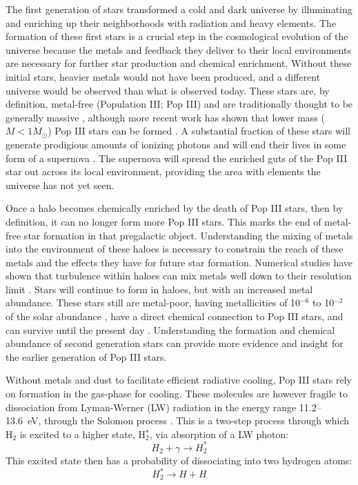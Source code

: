 \documentclass[fleqn,usenatbib]{mnras}
\begin{document}
The first generation of stars transformed a cold and dark universe 
by illuminating and enriching up their neighborhoods with radiation
and heavy elements. The formation of these first stars is a crucial step in the cosmological evolution of the universe because the metals and feedback they deliver to their local environments are necessary for further star production and chemical enrichment. Without these initial stars, heavier metals would not have been produced, and a different universe would be observed than what is observed today. These stars are, by definition, metal-free (Population III; Pop III) and are traditionally thought to be generally massive \citep{ABN02, Bromm02_P3, Turk09, Hosokawa11, Hosokawa16, Hirano15}, although more recent work has shown that lower mass ($M < 1 M_{\odot}$) Pop III stars can be formed \citep{Greif11_P3Cluster, Clark11_Frag, Stacy11}. A substantial fraction of these stars will generate prodigious amounts of ionizing photons and will end their lives in some form of a supernova \citep[e.g.][]{Schaerer02, Heger02}. The supernova will spread the enriched guts of the Pop III star out across its local environment, providing the area with elements the universe has not yet seen. 

Once a halo becomes chemically enriched by the death of Pop III stars, then by definition, it can no longer form more Pop III stars. This marks the end of metal-free star formation in that pregalactic object. Understanding the mixing of metals into the environment of these haloes is necessary to constrain the reach of these metals and the effects they have for future star formation. Numerical studies have shown that turbulence within haloes can mix metals well down to their resolution limit \citep{Wise08_Gal, Greif10, Smith15}. Stars will continue to form in haloes, but with an increased metal abundance. These stars still are metal-poor, having metallicities of 10$^{-6}$ to 10$^{-2}$ of the solar abundance \citep{Chiaki16, Chiaki18, Ritter16}, have a direct chemical connection to Pop III stars, and can survive until the present day \citep{Gnedin06, Tumlinson10, Griffen18, Magg18, Ezzeddine19}. Understanding the formation and chemical abundance of second generation stars can provide more evidence and insight for the earlier generation of Pop III stars.

Without metals and dust to facilitate efficient radiative cooling, Pop III stars rely on \hh{} formation in the gas-phase for cooling. These molecules are however fragile to dissociation from Lyman-Werner (LW) radiation in the energy range 11.2--13.6~eV, through the Solomon process \citep{Field66, Stecher67}. This is a two-step process through which H$_{2}$ is excited to a higher state, H$_{2}^{\ast}$, via absorption of a LW photon:
\begin{equation} \label{Solomon1}
	H_{2} + \gamma \rightarrow  H_{2}^{\ast}
\end{equation}
This excited state then has a probability of dissociating into two hydrogen atoms:
\begin{equation} \label{Solomon2}
	H_{2}^{\ast} \rightarrow H + H
\end{equation}
\end{document}
